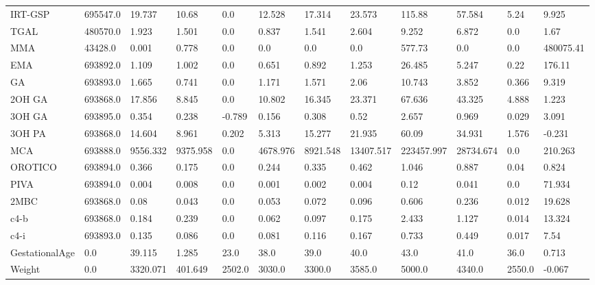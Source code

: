 \begin{tabular}{|l|l|l|l|l|l|l|l|l|l|l|l|}
IRT-GSP & 695547.0 & 19.737 & 10.68 & 0.0 & 12.528 & 17.314 & 23.573 & 115.88 & 57.584 & 5.24 & 9.925 \\
TGAL & 480570.0 & 1.923 & 1.501 & 0.0 & 0.837 & 1.541 & 2.604 & 9.252 & 6.872 & 0.0 & 1.67 \\
MMA & 43428.0 & 0.001 & 0.778 & 0.0 & 0.0 & 0.0 & 0.0 & 577.73 & 0.0 & 0.0 & 480075.41 \\
EMA & 693892.0 & 1.109 & 1.002 & 0.0 & 0.651 & 0.892 & 1.253 & 26.485 & 5.247 & 0.22 & 176.11 \\
GA & 693893.0 & 1.665 & 0.741 & 0.0 & 1.171 & 1.571 & 2.06 & 10.743 & 3.852 & 0.366 & 9.319 \\
2OH GA & 693868.0 & 17.856 & 8.845 & 0.0 & 10.802 & 16.345 & 23.371 & 67.636 & 43.325 & 4.888 & 1.223 \\
3OH GA & 693895.0 & 0.354 & 0.238 & -0.789 & 0.156 & 0.308 & 0.52 & 2.657 & 0.969 & 0.029 & 3.091 \\
3OH PA & 693868.0 & 14.604 & 8.961 & 0.202 & 5.313 & 15.277 & 21.935 & 60.09 & 34.931 & 1.576 & -0.231 \\
MCA & 693888.0 & 9556.332 & 9375.958 & 0.0 & 4678.976 & 8921.548 & 13407.517 & 223457.997 & 28734.674 & 0.0 & 210.263 \\
OROTICO & 693894.0 & 0.366 & 0.175 & 0.0 & 0.244 & 0.335 & 0.462 & 1.046 & 0.887 & 0.04 & 0.824 \\
PIVA & 693894.0 & 0.004 & 0.008 & 0.0 & 0.001 & 0.002 & 0.004 & 0.12 & 0.041 & 0.0 & 71.934 \\
2MBC & 693868.0 & 0.08 & 0.043 & 0.0 & 0.053 & 0.072 & 0.096 & 0.606 & 0.236 & 0.012 & 19.628 \\
c4-b & 693868.0 & 0.184 & 0.239 & 0.0 & 0.062 & 0.097 & 0.175 & 2.433 & 1.127 & 0.014 & 13.324 \\
c4-i & 693893.0 & 0.135 & 0.086 & 0.0 & 0.081 & 0.116 & 0.167 & 0.733 & 0.449 & 0.017 & 7.54 \\
GestationalAge & 0.0 & 39.115 & 1.285 & 23.0 & 38.0 & 39.0 & 40.0 & 43.0 & 41.0 & 36.0 & 0.713 \\
Weight & 0.0 & 3320.071 & 401.649 & 2502.0 & 3030.0 & 3300.0 & 3585.0 & 5000.0 & 4340.0 & 2550.0 & -0.067 \\
\bottomrule
\end{tabular}
